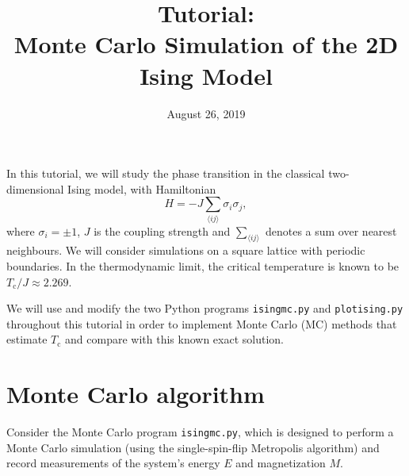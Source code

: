 \documentclass[letterpaper]{scrartcl}
\begin{document}

\title{Tutorial: \\ Monte Carlo Simulation of the 2D Ising Model}

\date{August 26, 2019}


\maketitle


In this tutorial, we will study the phase transition in the classical two-dimensional Ising model, with Hamiltonian
\begin{equation*}
H = -J \sum_{\langle ij \rangle} \sigma_i \sigma_j, 
\end{equation*}
where $\sigma_i = \pm 1$, $J$ is the coupling strength and $\sum_{\langle ij \rangle}$ denotes a sum over nearest neighbours.
We will consider simulations on a square lattice with periodic boundaries.
In the thermodynamic limit, the critical temperature is known to be ${ T_\text{c} }/{J} \approx 2.269$.

We will use and modify the two Python programs \texttt{ising{\textunderscore}mc.py} and \texttt{plot{\textunderscore}ising.py} throughout this tutorial 
in order to implement Monte Carlo (MC) methods that estimate $T_\text{c}$ and compare with this known exact solution.

\section{Monte Carlo algorithm}
Consider the Monte Carlo program \texttt{ising{\textunderscore}mc.py}, which is designed to perform a Monte Carlo simulation (using the single-spin-flip Metropolis algorithm) and record measurements of the system's energy $E$ and magnetization $M$. 
\end{document}
